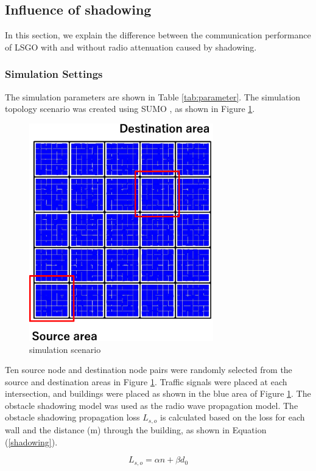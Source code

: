 \documentclass[conference]{IEEEtran}
\begin{document}
\subsection{Influence of shadowing}
\label{shadowing_evaluation}
In this section, we explain the difference between the communication performance of LSGO with and without radio attenuation caused by shadowing. 


\subsubsection{Simulation Settings} 
The simulation parameters are shown in Table \ref{tab:parameter}. 
The simulation topology scenario was created using SUMO \cite{27}, as shown in Figure \ref{fig:scenario}. 

\begin{figure}[!ht]
\centering
\includegraphics[width=80mm]{figures/scenario.eps}
\caption{simulation scenario }
\label{fig:scenario}
\end{figure}


Ten source node and destination node pairs were randomly selected from the source and destination areas in Figure \ref{fig:scenario}.
 Traffic signals were placed at each intersection, and buildings were placed as shown in the blue area of Figure \ref{fig:scenario}. 
The obstacle shadowing model \cite{20} was used as the radio wave propagation model. The obstacle shadowing propagation loss $L_{s,o}$ is calculated based on the loss for each wall and the distance (m) through the building, as shown in Equation (\ref{shadowing}).

\begin{equation}
\label{shadowing}
L_{s,o} = \alpha n  + \beta d_0
\end{equation}
\end{document}
